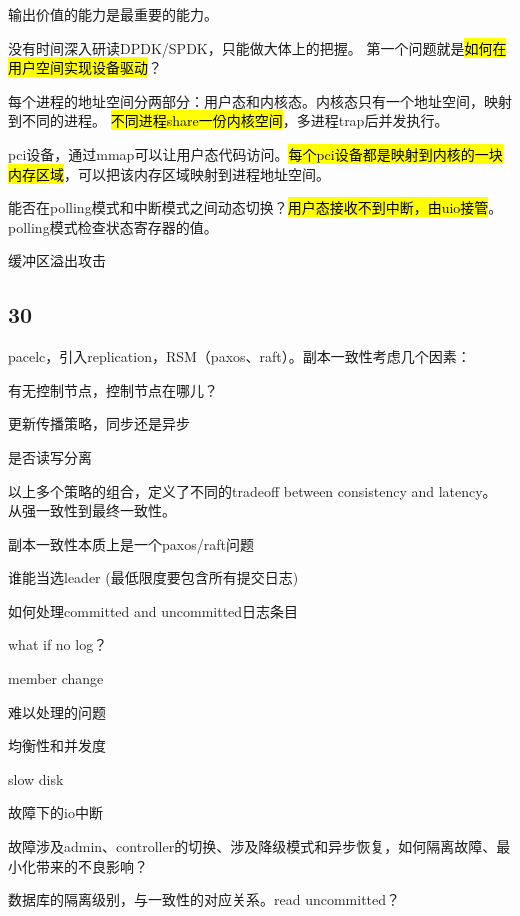 输出价值的能力是最重要的能力。

没有时间深入研读DPDK/SPDK，只能做大体上的把握。
第一个问题就是\hl{如何在用户空间实现设备驱动}？

每个进程的地址空间分两部分：用户态和内核态。内核态只有一个地址空间，映射到不同的进程。
\hl{不同进程share一份内核空间}，多进程trap后并发执行。

pci设备，通过mmap可以让用户态代码访问。\hl{每个pci设备都是映射到内核的一块内存区域}，可以把该内存区域映射到进程地址空间。

能否在polling模式和中断模式之间动态切换？\hl{用户态接收不到中断，由uio接管}。polling模式检查状态寄存器的值。

缓冲区溢出攻击

\subsection{30}

pacelc，引入replication，RSM（paxos、raft）。副本一致性考虑几个因素：
\begin{enumbox}
\item 有无控制节点，控制节点在哪儿？
\item 更新传播策略，同步还是异步
\item 是否读写分离
\end{enumbox}

以上多个策略的组合，定义了不同的tradeoff between consistency and latency。
从强一致性到最终一致性。

副本一致性本质上是一个paxos/raft问题
\begin{enumbox}
\item 谁能当选leader (最低限度要包含所有提交日志)
\item 如何处理committed and uncommitted日志条目
\item what if no log？
\item member change
\end{enumbox}

难以处理的问题
\begin{enumbox}
\item 均衡性和并发度
\item slow disk
\item 故障下的io中断
\end{enumbox}

故障涉及admin、controller的切换、涉及降级模式和异步恢复，如何隔离故障、最小化带来的不良影响？

数据库的隔离级别，与一致性的对应关系。read uncommitted？

